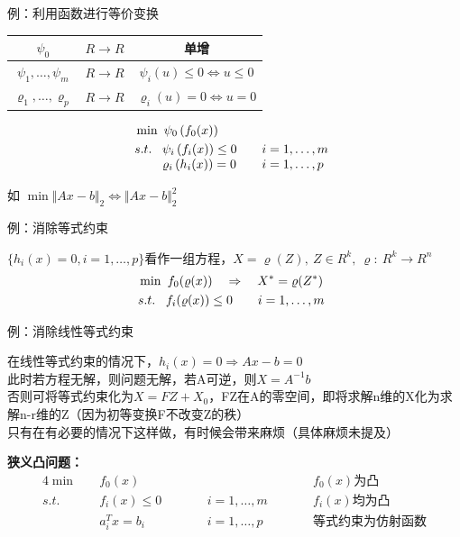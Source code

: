 \documentclass[11pt]{ctexart}         %
\newcommand{\rebacklinespread}[1][-12pt]{\vspace{#1}}
\newcommand{\oneline}[1][12pt]{\vspace{#1}}
\newcommand{\bcenter}[1]{\begin{center}#1\end{center}}
\newcommand{\li}[3][例]{
	#1：#2\\ 
	\phantom{#1：}\begin{minipage}[t]{0.9\linewidth}%
	\setlength\parskip{12pt}
	#3
	\end{minipage}
	\oneline}
\newcommand{\paint}[2][red]{{\color{#1}#2}} %
\begin{document}
\li{利用函数进行等价变换}{
	\begin{center}
		\begin{tabular}[t]{|c|c|c|}
			\hline
			$ \psi_0$&$ R\to R $& 单增 \\
			\hline
			$ \psi_1,\dots,\psi_m$&$ R\to R $& $ \psi_i(u)\leq 0 \Leftrightarrow u\leq 0 $ \\
			\hline
			$ \varrho_1,\dots,\varrho_p $& $ R\to R $&$ \varrho_i(u)=0\Leftrightarrow u=0 $ \\
			\hline
		\end{tabular}
	\end{center}
	\vspace{-24pt}
	\begin{align*}
		&\min\ \psi_0\,(f_0(x))\\
		& s.t.\ 
		\begin{array}[t]{ll}%
			\psi_i\,(f_i(x))\leq 0\quad &i=1,\dots,m\\
			\varrho_i\,(h_i(x))=0\quad &i=1,\dots,p
		\end{array}
	\end{align*}
	\bcenter{如 $ \min \Vert Ax-b\Vert_2\Leftrightarrow\Vert Ax-b\Vert_2^2 $}
}

\li{消除等式约束}{$\{h_i(x)=0,i=1,\dots,p\}$看作一组方程，$ X=\varrho(Z),\ Z\in R^k,\ \varrho:\ R^k\to R^n $
	\rebacklinespread
	\begin{align*}
		&\min\ f_0(\varrho(x))\quad \Rightarrow\quad  X^*=\varrho(Z^*)\\
		& s.t.\ 
		\begin{array}[t]{ll}%
			f_i(\varrho(x))\leq 0\quad &i=1,\dots,m
		\end{array}
	\end{align*}
}

\li{消除线性等式约束}{在线性等式约束的情况下，$ h_i(x)=0\Rightarrow Ax-b=0 $\\
	此时若方程无解，则问题无解，若A可逆，则$ X=A^{-1}b $\\
	否则可将等式约束化为$ X=FZ+X_0 $，FZ在A的零空间，即将求解n维的X化为求解n-r维的Z（因为初等变换F不改变Z的秩）\\
	\paint{只有在有必要的情况下这样做，有时候会带来麻烦（具体麻烦未提及）}}

\textbf{狭义凸问题：}
\rebacklinespread
\begin{alignat*}{4}%
	\min\quad &f_0(x)		&&			 &&\qquad f_0(x)\text{为凸}\\
	s.t.\quad &f_i(x)\leq 0	&&\qquad i=1,\dots,m &&\qquad f_i(x)\text{均为凸}\\
		  &a_i^Tx=b_i	&&\qquad i=1,\dots,p &&\qquad \text{等式约束为仿射函数}
\end{alignat*}
\end{document}
